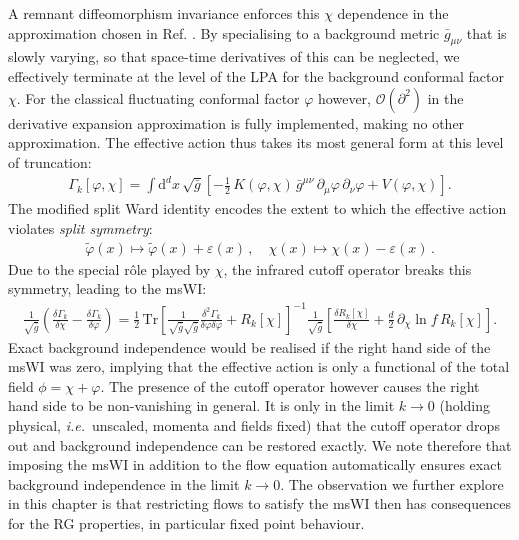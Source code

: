\documentclass[11pt]{book}
\newcommand\ie{\textit{i.e.}\ }
\newcommand{\eps}{\varepsilon}
\newcommand{\vp}{\varphi}
\newcommand{\dclnf}{\,\partial_\chi\! \ln\! f \,}
\numberwithin{equation}{chapter}
\begin{document}
A remnant diffeomorphism invariance enforces this $\chi$ dependence in the approximation chosen in
Ref. \cite{Dietz:2015owa}.
By specialising to a background metric ${\bar g}_{\mu\nu}$ that is slowly varying,
so that space-time derivatives of this can be neglected, we effectively terminate at the level of
the LPA for the background conformal factor $\chi$.
For the classical fluctuating conformal factor $\vp$ however,
$\mathcal{O}(\partial^2)$ in the derivative expansion approximation is fully implemented,
making no other approximation.
The effective action thus takes its most general form at this level of truncation:
\begin{align}
  \Gamma_k[\varphi, \chi] = \int \mathrm d^dx \, \sqrt{\bar g}
  \left[
    - \frac{1}{2} \, K(\varphi,\chi) \, \bar g^{\mu\nu} \, \partial_{\mu}\varphi \, \partial_{\nu}\varphi
    + V(\varphi,\chi)
  \right] .
  \label{trunc}
\end{align}
The modified split Ward identity encodes the extent to which the effective action violates
\textit{split symmetry}:
\begin{align}
  \tilde \vp(x) \mapsto \tilde \vp(x) + \eps(x) \,, \quad \chi(x) \mapsto \chi(x) -\eps(x)\,.
  \label{equ:split-symmetry}
\end{align}
Due to the special r\^ole played by $\chi$, the infrared cutoff operator breaks this symmetry,
leading to the msWI:
\begin{align}
  \frac{1}{\sqrt{\bar g}}
  \left(
    \frac{\delta\Gamma_k}{\delta \chi} - \frac{\delta \Gamma_k}{\delta \vp}
  \right)
  = \frac{1}{2} \, \mathrm{Tr}
  \left[
    \frac{1}{\sqrt{\bar g}\sqrt{\bar g}}\frac{\delta^2\Gamma_k}
    {\delta \vp \delta \vp}+ R_k[\chi]
  \right]^{-1}
  \frac{1}{\sqrt{\bar g}}
  \left[
    \frac{\delta R_k[\chi] }{\delta \chi}+\frac{d}{2}\dclnf R_k[\chi]
  \right] .
  \label{equ:sWiGamma}
\end{align}
Exact background independence would be realised if the right hand side of the msWI was zero,
implying that the effective action is only a functional of the total field $\phi = \chi + \vp$.
The presence of the cutoff operator however causes the right hand side to be non-vanishing in general.
It is only in the limit $k\rightarrow0$ (holding physical, \ie unscaled,
momenta and fields fixed) that the cutoff operator drops out and background independence can be
restored exactly. We note therefore that imposing the msWI in addition to the flow equation
automatically ensures exact background independence in the limit $k\rightarrow0$.
The observation we further explore in this chapter is that restricting flows to
satisfy the msWI then has consequences for the RG properties,
in particular fixed point behaviour.
\end{document}
